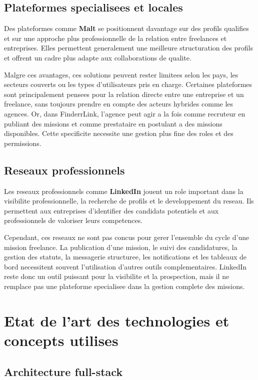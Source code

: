 \subsection{Plateformes specialisees et locales}

Des plateformes comme \textbf{Malt} se positionnent davantage sur des profils qualifies et sur une approche plus professionnelle de la relation entre freelances et entreprises. Elles permettent generalement une meilleure structuration des profils et offrent un cadre plus adapte aux collaborations de qualite.

Malgre ces avantages, ces solutions peuvent rester limitees selon les pays, les secteurs couverts ou les types d'utilisateurs pris en charge. Certaines plateformes sont principalement pensees pour la relation directe entre une entreprise et un freelance, sans toujours prendre en compte des acteurs hybrides comme les agences. Or, dans FinderrLink, l'agence peut agir a la fois comme recruteur en publiant des missions et comme prestataire en postulant a des missions disponibles. Cette specificite necessite une gestion plus fine des roles et des permissions.

\subsection{Reseaux professionnels}

Les reseaux professionnels comme \textbf{LinkedIn} jouent un role important dans la visibilite professionnelle, la recherche de profils et le developpement du reseau. Ils permettent aux entreprises d'identifier des candidats potentiels et aux professionnels de valoriser leurs competences.

Cependant, ces reseaux ne sont pas concus pour gerer l'ensemble du cycle d'une mission freelance. La publication d'une mission, le suivi des candidatures, la gestion des statuts, la messagerie structuree, les notifications et les tableaux de bord necessitent souvent l'utilisation d'autres outils complementaires. LinkedIn reste donc un outil puissant pour la visibilite et la prospection, mais il ne remplace pas une plateforme specialisee dans la gestion complete des missions.

\section{Etat de l'art des technologies et concepts utilises}

\subsection{Architecture full-stack}


